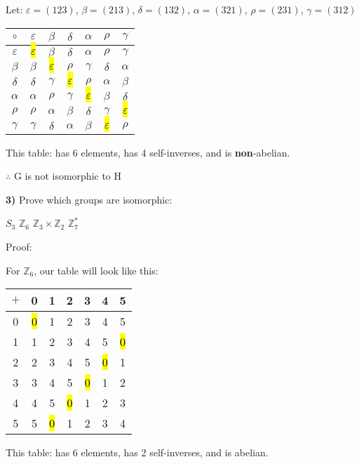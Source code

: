 \documentclass{article}
\begin{document}
Let: $\varepsilon= (123)$,
$\beta=(213)$,
$\delta=(132)$,
$\alpha=(321)$,
$\rho=(231)$,
$\gamma =(312)$
\begin{table} [ht]
\begin{tabular} {|c| |c| |c| |c| |c| |c| |c|}

\hline
$\circ$ & $\varepsilon$ & $\beta$ & $\delta$ & $\alpha$ & $\rho$  & $\gamma$ \\

\hline
$\varepsilon$ & \hl{$\varepsilon$} & $\beta$ &  $\delta$ & $\alpha$  & $\rho$ &  $\gamma$ \\

\hline
$\beta$ & $\beta$  & \hl{$\varepsilon$} & $\rho$ & $\gamma$ & $\delta$ & $\alpha$ \\

\hline
$\delta$ &$\delta$ &  $\gamma$ & \hl{$\varepsilon$} & $\rho$ &  $\alpha$ & $\beta$ \\

\hline
$\alpha$ & $\alpha$ & $\rho$ & $\gamma$ & \hl{$\varepsilon$} & $\beta$ & $\delta$ \\

\hline
$\rho$ & $\rho$ & $\alpha$ & $\beta$ & $\delta$ & $\gamma$ & \hl{$\varepsilon$}  \\ 

\hline
$\gamma$ & $\gamma$ & $\delta$ & $\alpha$ & $\beta$ & \hl{$\varepsilon$} & $\rho$
\end{tabular}
\end{table}


This table: has 6 elements,  has 4 self-inverses, and is \textbf{non}-abelian.
\medskip

$\therefore$ G is not isomorphic to  H
\newpage

\textbf{3)} Prove which groups are isomorphic:

$S_3$ \hspace{.1in} $\mathbb{Z} _6$  \hspace{.1in} $\mathbb{Z}_3\times \mathbb{Z}_2$ \hspace{.1in} $\mathbb{Z}_7^{*} $
\medskip


Proof:
\medskip

For $\mathbb{Z}_6$, our table will look like this:


\begin{table}[ht]
	\begin{tabular}{|c| |c| |c| |c| |c| |c| |c|}		
	\hline
	$ +$ & 0 & 1 & 2 & 3 & 4 & 5 \\
	\hline
	0 & \hl{0} & 1 & 2 & 3 & 4 & 5 \\
	\hline
	1 & 1&  2& 3 & 4 & 5 & \hl{0} \\
	\hline
	2& 2 & 3  & 4 & 5& \hl{0} & 1 \\
	\hline
	3 & 3 & 4  & 5 & \hl{0} & 1 & 2 \\
	\hline
 	4 & 4 & 5  & \hl{0} & 1 & 2 & 3 \\
	\hline
	5& 5 & \hl{0}  & 1 & 2 & 3 & 4 
	\end{tabular}
\end{table}
This table: has 6 elements, has 2 self-inverses, and is abelian.
\end{document}
